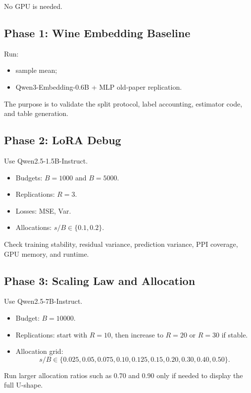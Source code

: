 \documentclass[11pt]{article}
\begin{document}
No GPU is needed.

\subsection{Phase 1: Wine Embedding Baseline}

Run:

\begin{itemize}
    \item sample mean;
    \item Qwen3-Embedding-0.6B + MLP old-paper replication.
\end{itemize}

The purpose is to validate the split protocol, label accounting, estimator code, and table generation.

\subsection{Phase 2: LoRA Debug}

Use Qwen2.5-1.5B-Instruct.

\begin{itemize}
    \item Budgets: $B=1000$ and $B=5000$.
    \item Replications: $R=3$.
    \item Losses: MSE, Var.
    \item Allocations: $s/B\in\{0.1,0.2\}$.
\end{itemize}

Check training stability, residual variance, prediction variance, PPI coverage, GPU memory, and runtime.

\subsection{Phase 3: Scaling Law and Allocation}

Use Qwen2.5-7B-Instruct.

\begin{itemize}
    \item Budget: $B=10000$.
    \item Replications: start with $R=10$, then increase to $R=20$ or $R=30$ if stable.
    \item Allocation grid:
    \[
    s/B\in\{0.025,0.05,0.075,0.10,0.125,0.15,0.20,0.30,0.40,0.50\}.
    \]
\end{itemize}

Run larger allocation ratios such as 0.70 and 0.90 only if needed to display the full U-shape.
\end{document}
